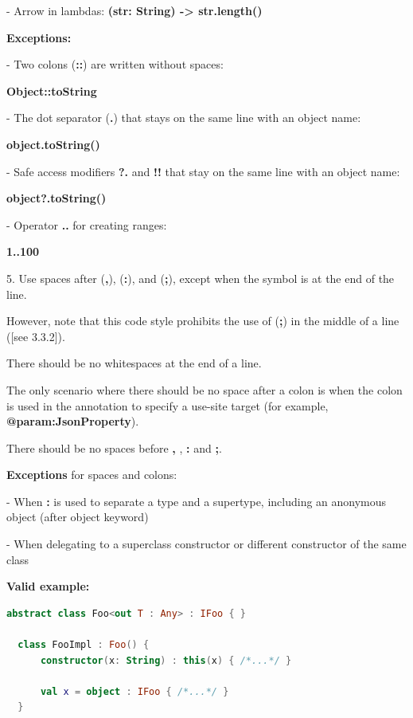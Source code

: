  - Arrow in lambdas: \textbf{(str: String) -> str.length()}



\textbf{Exceptions:}



- Two colons (\textbf{::}) are written without spaces:\

  \textbf{Object::toString}

- The dot separator (\textbf{.}) that stays on the same line with an object name:\

  \textbf{object.toString()}

- Safe access modifiers \textbf{?.} and \textbf{!!} that stay on the same line with an object name:\

  \textbf{object?.toString()}

- Operator \textbf{..} for creating ranges:\

  \textbf{1..100}



5.  Use spaces after (\textbf{,}), (\textbf{:}), and (\textbf{;}), except when the symbol is at the end of the line.

    However, note that this code style prohibits the use of (\textbf{;}) in the middle of a line ([see 3.3.2]).

    There should be no whitespaces at the end of a line.

    The only scenario where there should be no space after a colon is when the colon is used in the annotation to specify a use-site target (for example, \textbf{@param:JsonProperty}).

    There should be no spaces before \textbf{,} , \textbf{:} and \textbf{;}. 

    

    \textbf{Exceptions} for spaces and colons:

    

    - When \textbf{:} is used to separate a type and a supertype, including an anonymous object (after object keyword)

    - When delegating to a superclass constructor or different constructor of the same class



\textbf{Valid example:}

\begin{lstlisting}[language=Kotlin]
  abstract class Foo<out T : Any> : IFoo { }
  
  class FooImpl : Foo() {
      constructor(x: String) : this(x) { /*...*/ }
      
      val x = object : IFoo { /*...*/ } 
  }
\end{lstlisting}


